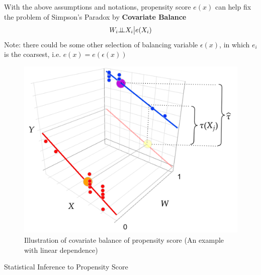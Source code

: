     
With the above assumptions and notations, propensity score $ e(x) $ can help fix the problem of Simpson's Paradox by \textbf{Covariate Balance}
\begin{align*}
    W_i\bot\!\!\!\bot X_i\big| e(X_i) 
\end{align*}
Note: there could be some other selection of balancing variable $ \epsilon(x) $, in which $ e_i $ is the coarsest, i.e. $ e(x)= e(\epsilon(x))  $
\begin{figure}[H]
    \centering
    \includegraphics[width=0.55\linewidth]{sections/images/propensity.png}
    \caption{Illustration of covariate balance of propensity score (An example with linear dependence)}
\end{figure}

\begin{point}
    Statistical Inference to Propensity Score
\end{point}

